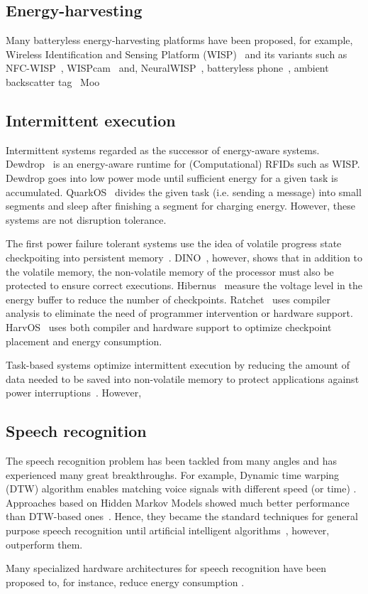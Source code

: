 \subsection{Energy-harvesting}
Many batteryless energy-harvesting platforms have been proposed, for example, Wireless Identification and Sensing Platform (WISP)~\cite{smith_ubicomp_2006} and its variants such as NFC-WISP~\cite{zhao2015nfc}, WISPcam~\cite{naderiparizi_rfid_2015} and, NeuralWISP~\cite{yeager2009neuralwisp}, batteryless phone~\cite{talla2017battery}, ambient backscatter tag~\cite{liu2013ambient} Moo~\cite{moo}

\subsection{Intermittent execution}
Intermittent systems regarded as the successor of energy-aware systems. Dewdrop~\cite{buettner2011dewdrop} is an energy-aware runtime for (Computational) RFIDs such as WISP. 
Dewdrop goes into low power mode until sufficient energy for a given task is accumulated. QuarkOS~\cite{zhang2013quarkos} divides the given task (i.e. sending a message)  into small segments and sleep after finishing a segment for charging energy. However, these systems are not disruption tolerance.  

The first power failure tolerant systems use the idea of volatile progress state checkpoiting into persistent memory~\cite{mementos}. DINO~\cite{dino}, however, shows that in addition to the volatile memory, the non-volatile memory of the processor must also be protected to ensure correct executions. Hibernus~\cite{balsamo2015hibernus} measure the voltage level in the energy buffer to reduce the number of checkpoints. Ratchet~\cite{woude2016ratchet} uses compiler analysis to eliminate the need of programmer intervention or hardware support. HarvOS~\cite{bhatti2017harvos} uses both compiler and hardware support to optimize checkpoint placement and energy consumption.

Task-based systems optimize intermittent execution by reducing the amount of data needed to be saved into non-volatile memory to protect applications against power interruptions~\cite{colin2016chain}. However,  



\subsection{Speech recognition}
The speech recognition problem has been tackled from many angles and has experienced many great breakthroughs. For example, Dynamic time warping (DTW) algorithm enables matching voice signals with different speed (or time) \cite{}. Approaches based on Hidden Markov Models showed much better performance than DTW-based ones~\cite{jelinek1997statistical}. Hence, they became the standard techniques for general purpose speech recognition until artificial intelligent algorithms~\cite{hinton2012deep}, however, outperform them. 

Many specialized hardware architectures for speech recognition have been proposed to, for instance, reduce energy consumption \cite{price2018low,price20156}. 
